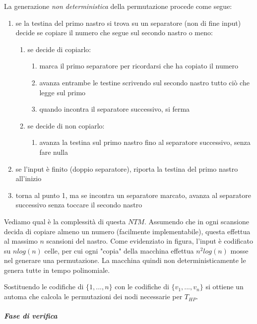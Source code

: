 La generazione \emph{non deterministica} della permutazione procede come segue:
\begin{enumerate}[label*=\arabic*.]
	\item se la testina del primo nastro si trova su un separatore (non di fine input) decide se copiare il numero che segue sul secondo nastro o meno:
	\begin{enumerate}[label*=\arabic*.]
		\item se decide di copiarlo:
		\begin{enumerate}[label*=\arabic*.]
			\item marca il primo separatore per ricordarsi che ha copiato il numero 
			\item avanza entrambe le testine scrivendo sul secondo nastro tutto ciò che legge sul primo
			\item quando incontra il separatore successivo, si ferma
		\end{enumerate}
		\item se decide di non copiarlo:
		\begin{enumerate}[label*=\arabic*.]
			\item avanza la testina sul primo nastro fino al separatore successivo, senza fare nulla
		\end{enumerate}
	\end{enumerate}
	\item se l'input è finito (doppio separatore), riporta la testina del primo nastro all'inizio
	\item torna al punto 1, ma se incontra un separatore marcato, avanza al separatore successivo senza toccare il secondo nastro
\end{enumerate}

Vediamo qual è la complessità di questa $NTM$. Assumendo che in ogni scansione decida di copiare almeno un numero (facilmente implementabile), questa effettua al massimo $n$ scansioni del nastro. Come evidenziato in figura, l'input è codificato su $nlog(n)$ celle, per cui ogni "copia" della macchina effettua $n^2 log(n)$ mosse nel generare una permutazione. La macchina quindi non deterministicamente le genera tutte in tempo polinomiale.

Sostituendo le codifiche di $\{1, ..., n\}$ con le codifiche di $\{ v_1, ..., v_n\}$ si ottiene un automa che calcola le permutazioni dei nodi necessarie per $T_{HP}$.

\subparagraph{Fase di verifica}

